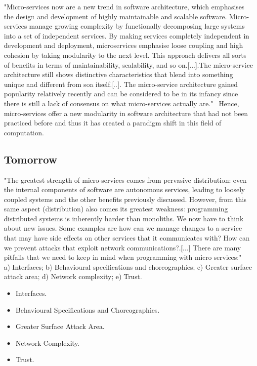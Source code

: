"Micro-services now are a new trend in software architecture, which emphasises the design and development of highly maintainable and scalable software. Micro-services manage growing complexity by functionally decomposing large systems into a set of independent services. By making services completely independent in development and deployment, microservices emphasise loose coupling and high cohesion by taking modularity to the next level. This approach delivers all sorts of benefits in terms of maintainability, scalability, and so on.[...].The micro-service architecture still shows distinctive characteristics that blend into something unique and different from \gls{soa} itself.[..]. The micro-service architecture gained popularity relatively recently and can be considered to be in its infancy since there is still a lack of consensus on what micro-services actually are."~\cite{microservicesStateOfArt} Hence, micro-services offer a new modularity in software architecture that had not been practiced before and thus it has created a paradigm shift in this field of computation.

\subsection{Tomorrow}

"The greatest strength of micro-services comes from pervasive distribution: even the internal components of software are autonomous services, leading to loosely coupled systems and the other benefits previously discussed. However, from this same aspect (distribution) also comes its greatest weakness: programming distributed systems is inherently harder than monoliths. We now have to think about new issues. Some examples are how can we manage changes to a service that may have side effects on other services that it communicates with? How can we prevent attacks that exploit network communications?.[...] There are many pitfalls that we need to keep in mind when programming with
micro services:"~\cite{microservicesStateOfArt} a) Interfaces; b) Behavioural specifications and choreographies; c) Greater surface attack area; d) Network complexity; e) Trust.

\begin{itemize}
    \item Interfaces.
    \item Behavioural Specifications and Choreographies.
    \item Greater Surface Attack Area.
    \item Network Complexity.
    \item Trust.
\end{itemize}
